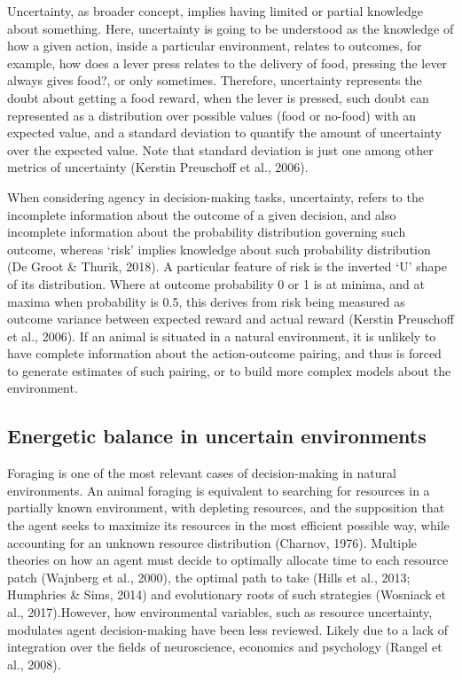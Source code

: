 \documentclass[
]{/home/nicoluarte/Downloads/templates/PNAS-template-main.tex}
\begin{document}
Uncertainty, as broader concept, implies having limited or partial
knowledge about something. Here, uncertainty is going to be understood
as the knowledge of how a given action, inside a particular environment,
relates to outcomes, for example, how does a lever press relates to the
delivery of food, pressing the lever always gives food?, or only
sometimes. Therefore, uncertainty represents the doubt about getting a
food reward, when the lever is pressed, such doubt can represented as a
distribution over possible values (food or no-food) with an expected
value, and a standard deviation to quantify the amount of uncertainty
over the expected value. Note that standard deviation is just one among
other metrics of uncertainty (Kerstin Preuschoff et al., 2006).

When considering agency in decision-making tasks, uncertainty, refers to
the incomplete information about the outcome of a given decision, and
also incomplete information about the probability distribution governing
such outcome, whereas `risk' implies knowledge about such probability
distribution (De Groot \& Thurik, 2018). A particular feature of risk is
the inverted `U' shape of its distribution. Where at outcome probability
0 or 1 is at minima, and at maxima when probability is 0.5, this derives
from risk being measured as outcome variance between expected reward and
actual reward (Kerstin Preuschoff et al., 2006). If an animal is
situated in a natural environment, it is unlikely to have complete
information about the action-outcome pairing, and thus is forced to
generate estimates of such pairing, or to build more complex models
about the environment.

\hypertarget{energetic-balance-in-uncertain-environments}{%
\subsection{Energetic balance in uncertain
environments}\label{energetic-balance-in-uncertain-environments}}

Foraging is one of the most relevant cases of decision-making in natural
environments. An animal foraging is equivalent to searching for
resources in a partially known environment, with depleting resources,
and the supposition that the agent seeks to maximize its resources in
the most efficient possible way, while accounting for an unknown
resource distribution (Charnov, 1976). Multiple theories on how an agent
must decide to optimally allocate time to each resource patch (Wajnberg
et al., 2000), the optimal path to take (Hills et al., 2013; Humphries
\& Sims, 2014) and evolutionary roots of such strategies (Wosniack et
al., 2017).However, how environmental variables, such as resource
uncertainty, modulates agent decision-making have been less reviewed.
Likely due to a lack of integration over the fields of neuroscience,
economics and psychology (Rangel et al., 2008).
\end{document}
